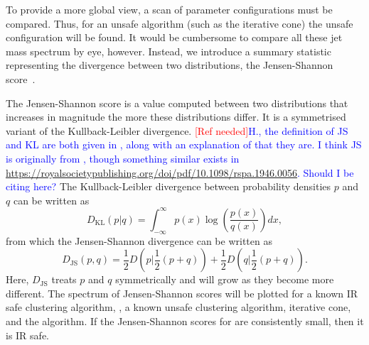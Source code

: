     To provide a more global view, a scan of parameter configurations must be compared.
    Thus, for an unsafe algorithm (such as the iterative cone) the unsafe configuration
    will be found.
    It would be cumbersome to compare all these jet mass spectrum by eye, however.
    Instead, we introduce a summary statistic representing the divergence between two distributions,
    the Jensen-Shannon score~\cite{jensen_shannon}.

    The Jensen-Shannon score is a value computed between two distributions that increases in magnitude the more these distributions differ.
    It is a symmetrised variant of the Kullback-Leibler divergence. {\textcolor{red}{[Ref needed]}\textcolor{blue}{H., the definition of JS and KL are both given in \cite{jensen_shannon}, along with an explanation of that they are. I think JS is originally from \cite{jensen_shannon}, though something similar exists in \url{https://royalsocietypublishing.org/doi/pdf/10.1098/rspa.1946.0056}. Should I be citing \cite{jensen_shannon} here?}}
    The Kullback-Leibler divergence between probability densities \(p\) and \(q\) can be written as
    \begin{equation}
    D_\text{KL} (p | q) = \int^{\infty}_{-\infty} p(x) \log\left(\frac{p(x)}{q(x)}\right) dx,
\end{equation}
    from which the Jensen-Shannon divergence can be written as
    \begin{equation}
    D_\text{JS}(p, q) = \frac{1}{2}D\left(p | \frac{1}{2}(p + q)\right) + \frac{1}{2}D\left(q | \frac{1}{2}(p + q)\right).
\end{equation}
    Here, \(D_\text{JS}\) treats \(p\) and \(q\) symmetrically and will grow as they become more different.
    The spectrum of Jensen-Shannon scores will be plotted for a known IR safe clustering algorithm, \antikt{},
    a known unsafe clustering algorithm, iterative cone, and the \spectral{} algorithm.
    If the Jensen-Shannon scores for \spectral{} are consistently small,
    then it is IR safe.

